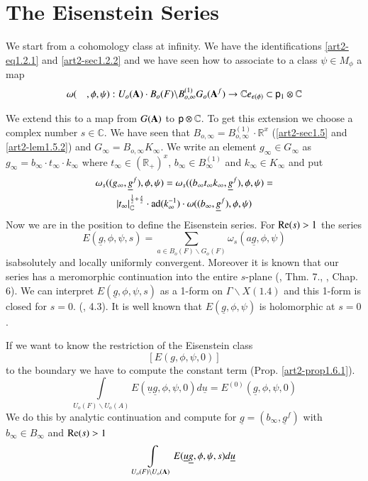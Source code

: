 \section{The Eisenstein Series}\label{art2-sec2}


We start from a cohomology class at infinity. We have the identifications \ref{art2-eq1.2.1} and \ref{art2-sec1.2.2} and we have seen how to associate to a class $\psi\in M_{\phi}$ a map
$$
\omega(\quad,\phi,\psi):U_{o}(\mathbf{A})\cdot B_{o}(F)\backslash B_{o,\infty}^{(1)}G_{o}(\mathbf{A}^{f})\to \mathbb{C} e_{\epsilon(\phi)}\subset \mathsf{p}_{1}\otimes \mathbb{C}
$$

We extend this to a map from $G(\mathbf{A})$ to $\mathsf{p}\otimes \mathbb{C}$. To get this extension we choose a complex number $s\in \mathbb{C}$. We have seen that $B_{o,\infty}=B_{o,\infty}^{(1)}\cdot \mathbb{R}^{x}$ (\ref{art2-sec1.5} and \ref{art2-lem1.5.2}) and $G_{\infty}=B_{o,\infty}K_{\infty}$. We write an element $g_{\infty}\in G_{\infty}$ as $g_{\infty}=b_{\infty}\cdot t_{\infty}\cdot k_{\infty}$ where $t_{\infty}\in (\mathbb{R}_{+})^{x}$, $b_{\infty}\in B^{(1)}_{\infty}$ and $k_{\infty}\in K_{\infty}$ and put
\begin{gather*}
\omega_{s}((g_{\infty},\underline{g}^{f}),\phi,\psi)=\omega_{s}((b_{\infty}t_{\infty}k_{\infty},\underline{g}^{f}),\phi,\psi)=\\
|t_{\infty}|_{\mathbb{C}}^{\frac{1}{2}+\frac{s}{2}}\cdot \operatorname{ad}(k_{\infty}^{-1})\cdot \omega((b_{\infty},\underline{g}^{f}),\phi,\psi)
\end{gather*}
Now we are in the position to define the Eisenstein series. For $\mathrm{Re}(s)>1$ the series
$$
E(\underline{g},\phi,\psi,s)=\sum\limits_{a\in B_{o}(F)\backslash G_{o}(F)}\omega_{s}(a\underline{g},\phi,\psi)
$$
is\pageoriginale absolutely and locally uniformly convergent. Moreover it is known that our series has a meromorphic continuation into the entire $s$-plane (\cite{art2-key9}, Thm. 7., \cite{art2-key13}, Chap. 6). We can interpret $E(\underline{g},\phi,\psi,s)$ as a 1-form on $\Gamma\backslash X(1.4)$ and this 1-form is closed for $s=0$. (\cite{art2-key8}, 4.3). It is well known that $E(\underline{g},\phi,\psi)$ is holomorphic at $s=0$.

If we want to know the restriction of the Eisenstein class 
$$
[E(g,\phi,\psi,0)]
$$ 
to the boundary we have to compute the constant term (Prop. \ref{art2-prop1.6.1}).
$$
\int\limits_{U_{o}(F)\backslash U_{o}(A)}E(\underline{u}\underline{g},\phi,\psi,0)d\underline{u}=E^{(0)}(\underline{g},\phi,\psi,0)
$$
We do this by analytic continuation and compute for $\underline{g}=(b_{\infty},\underline{g}^{f})$ with $b_{\infty}\in B_{\infty}$ and $\mathrm{Re}(s)>1$
$$
\int\limits_{U_{o}(F)\backslash U_{o}(\mathbf{A})}E(\underline{u}\underline{g},\phi,\psi,s)d\underline{u}
$$

